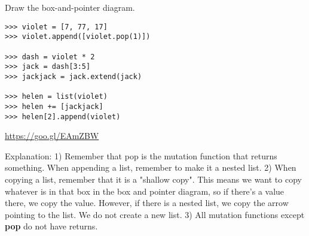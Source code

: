 \begin{blocksection}
\question Draw the box-and-pointer diagram. \\

\begin{lstlisting}
>>> violet = [7, 77, 17]
>>> violet.append([violet.pop(1)])

>>> dash = violet * 2
>>> jack = dash[3:5]
>>> jackjack = jack.extend(jack)

>>> helen = list(violet)
>>> helen += [jackjack]
>>> helen[2].append(violet)
\end{lstlisting}

\begin{solution}[1in]
\url{https://goo.gl/EAmZBW}

Explanation:
1) Remember that pop is the mutation function that returns something. When appending a list,
remember to make it a nested list.
2) When copying a list, remember that it is a "shallow copy". This means we  want to copy
whatever is in that box in the box and pointer diagram, so if there's a value there, we copy the value. However,
if there is a nested list, we copy the arrow pointing to the list. We do not create a new list.
3) All mutation functions except \textbf{pop} do not have returns.
\end{solution}
\end{blocksection}
